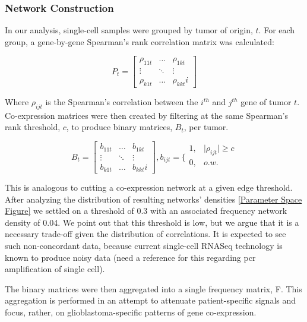 \documentclass[10pt,letterpaper]{article}
\begin{document}
\subsubsection{Network Construction}
In our analysis, single-cell samples were grouped by tumor of origin, $t$. For each group, a gene-by-gene Spearman’s rank correlation matrix was calculated: 

\begin{equation}\label{equation3}
 P_t = \left[ \begin{array}{ccc}
\rho_{11t} & \ldots & \rho_{1kt} \\
\vdots & \ddots & \vdots \\
\rho_{k1t} & \ldots & \rho_{kkt}i \end{array} \right]
\end{equation}

Where $\rho_{ijt}$ is the Spearman’s correlation between the $i^{th}$ and $j^{th}$ gene of tumor $t$. Co-expression matrices were then created by filtering at the same Spearman’s rank threshold, $c$, to produce binary matrices, $B_t$, per tumor. 

\begin{equation}\label{equation4}
B_t = \left[ \begin{array}{ccc}
b_{11t} & \ldots & b_{1kt} \\
\vdots & \ddots & \vdots \\
b_{k1t} & \ldots & b_{kkt}i \end{array}
\right]
, b_{ijt}=\{ \begin{array} {cc}
1, & \vert\rho_{ijt}\vert\ge c \\
0, & o.w. \\
\end{array}
\end{equation}

This is analogous to cutting a co-expression network at a given edge threshold. After analyzing the distribution of resulting networks’ densities \ref{Parameter Space Figure} we settled on a threshold of 0.3 with an associated frequency network density of 0.04. We point out that this threshold is low, but we argue that it is a necessary trade-off given the distribution of correlations. It is expected to see such non-concordant data, because current single-cell RNASeq technology is known to produce noisy data (need a reference for this regarding pcr amplification of single cell).

The binary matrices were then aggregated into a single frequency matrix, F. This aggregation is performed in an attempt to attenuate patient-specific signals and focus, rather, on glioblastoma-specific patterns of gene co-expression.
\end{document}
